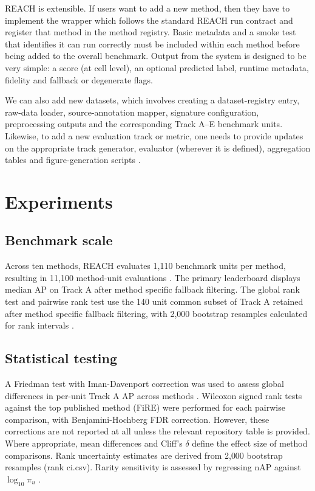 \documentclass[10pt]{article}
\begin{document}
REACH is extensible. If users want to add a new method, then they have to implement the wrapper which follows the standard REACH run contract and register that method in the method registry. Basic metadata and a smoke test that identifies it can run correctly must be included within each method before being added to the overall benchmark. Output from the system is designed to be very simple: a score (at cell level), an optional predicted label, runtime metadata, fidelity and fallback or degenerate flags.

We can also add new datasets, which involves creating a dataset-registry entry, raw-data loader, source-annotation mapper, signature configuration, preprocessing outputs and the corresponding Track A--E benchmark units. Likewise, to add a new evaluation track or metric, one needs to provide updates on the appropriate track generator, evaluator (wherever it is defined), aggregation tables and figure-generation scripts \cite{everingham2010pascal,abdelaal2019comparison,tran2020benchmark}.

\section{Experiments}

\subsection{Benchmark scale}

Across ten methods, REACH evaluates 1,110 benchmark units per method, resulting in 11,100 method-unit evaluations \cite{abdelaal2019comparison,abdelaal2025benchmarking}. The primary leaderboard displays median AP on Track A after method specific fallback filtering. The global rank test and pairwise rank test use the 140 unit common subset of Track A retained after method specific fallback filtering, with 2,000 bootstrap resamples calculated for rank intervals \cite{cao2021benchmark}.

\subsection{Statistical testing}

A Friedman test with Iman-Davenport correction was used to assess global differences in per-unit Track A AP across methods \cite{gorodkin2004comparing}. Wilcoxon signed rank tests against the top published method (FiRE) were performed for each pairwise comparison, with Benjamini-Hochberg FDR correction. However, these corrections are not reported at all unless the relevant repository table is provided. Where appropriate, mean differences and Cliff’s $\delta$ define the effect size of method comparisons. Rank uncertainty estimates are derived from 2{,}000 bootstrap resamples (rank ci.csv). Rarity sensitivity is assessed by regressing nAP against $\log_{10} \pi_u$ \cite{saito2015precision,davis2006relationship}.
\end{document}
